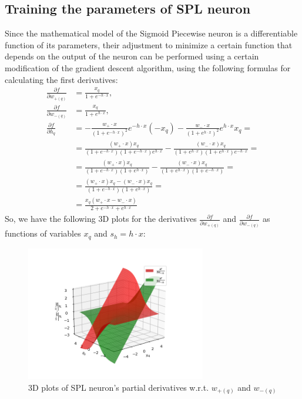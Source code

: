 \documentclass[sn-apa]{sn-jnl}%
\begin{document}
\subsection{Training the parameters of SPL neuron}\label{subsec52}
Since the mathematical model of the Sigmoid Piecewise neuron is a differentiable function of its parameters, their adjustment to minimize a certain function that depends on the output of the neuron can be performed using a certain modification of the gradient descent algorithm, using the following formulas for calculating the first derivatives:
\begin{align}
\frac{\partial f}{\partial w_{+(q)}} &= \frac{x_q}{1+e^{-h \cdot x}}, \label{eq13} \\
\frac{\partial f}{\partial w_{-(q)}} &= \frac{x_q}{1+e^{h \cdot x}}, \label{eq14} \\
\frac{\partial f}{\partial h_q} &=-\frac{w_+ \cdot x}{(1+e^{-h \cdot x})^2}e^{-h \cdot x}(-x_q)
	-\frac{w_- \cdot x}{(1+e^{h \cdot x})^2}e^{h \cdot x}x_q= \nonumber \\
 &= \frac{(w_+ \cdot x)x_q}{(1+e^{-h \cdot x})(1+e^{-h \cdot x})e^{h \cdot x}}-
	\frac{(w_- \cdot x)x_q}{(1+e^{h \cdot x})(1+e^{h \cdot x})e^{-h \cdot x}}=  \nonumber \\
 &=\frac{(w_+ \cdot x)x_q}{(1+e^{-h \cdot x})(1+e^{h \cdot x})}-
	\frac{(w_- \cdot x)x_q}{(1+e^{h \cdot x})(1+e^{-h \cdot x})}=  \nonumber \\
 &=\frac{(w_+ \cdot x)x_q - (w_- \cdot x)x_q}{(1+e^{-h \cdot x})(1+e^{h \cdot x})}=  \nonumber \\
& =\frac{x_q(w_+ \cdot x - w_- \cdot x)}{2+e^{-h \cdot x} + e^{h \cdot x}} \label{eq15}
\end{align}
So, we have the following 3D plots for the derivatives $\frac{\partial f}{\partial w_{+(q)}}$ and $\frac{\partial f}{\partial w_{-(q)}}$ as functions of variables $x_q$ and $s_h=h \cdot x$:

\begin{figure}[H]
\centering
\includegraphics[width=0.7\textwidth]{spl_neuron_wp_wm_partial_derivatives_3d_surfaces.png}
\caption{3D plots of SPL neuron's partial derivatives w.r.t. $w_{+(q)}$ and $w_{-(q)}$}\label{fig5}
\end{figure}
\end{document}
